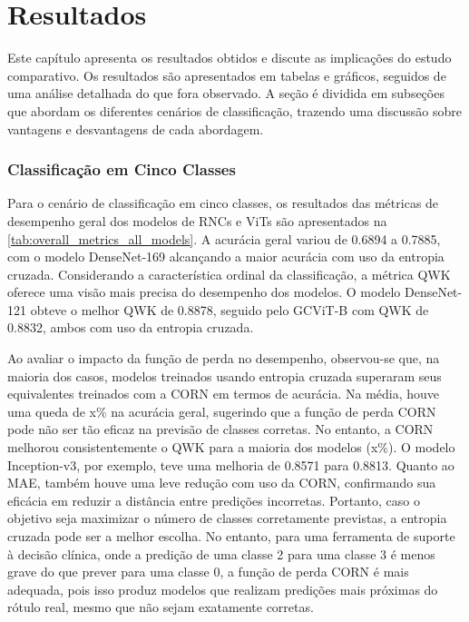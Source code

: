 \chapter{Resultados} \label{cap:resultados}

Este capítulo apresenta os resultados obtidos e discute as implicações do estudo comparativo. Os resultados são apresentados em tabelas e gráficos, seguidos de uma análise detalhada do que fora observado. A seção é dividida em subseções que abordam os diferentes cenários de classificação, trazendo uma discussão sobre vantagens e desvantagens de cada abordagem.

\subsection{Classificação em Cinco Classes}

Para o cenário de classificação em cinco classes, os resultados das métricas de desempenho geral dos modelos de RNCs e ViTs são apresentados na \autoref{tab:overall_metrics_all_models}. A acurácia geral variou de 0.6894 a 0.7885, com o modelo DenseNet-169 alcançando a maior acurácia com uso da entropia cruzada. Considerando a característica ordinal da classificação, a métrica QWK oferece uma visão mais precisa do desempenho dos modelos. O modelo DenseNet-121 obteve o melhor QWK de 0.8878, seguido pelo GCViT-B com QWK de 0.8832, ambos com uso da entropia cruzada.

Ao avaliar o impacto da função de perda no desempenho, observou-se que, na maioria dos casos, modelos treinados usando entropia cruzada superaram seus equivalentes treinados com a CORN em termos de acurácia. Na média, houve uma queda de x\% na acurácia geral, sugerindo que a função de perda CORN pode não ser tão eficaz na previsão de classes corretas. No entanto, a CORN melhorou consistentemente o QWK para a maioria dos modelos (x\%). O modelo Inception-v3, por exemplo, teve uma melhoria de 0.8571 para 0.8813. Quanto ao MAE, também houve uma leve redução com uso da CORN, confirmando sua eficácia em reduzir a distância entre predições incorretas. Portanto, caso o objetivo seja maximizar o número de classes corretamente previstas, a entropia cruzada pode ser a melhor escolha. No entanto, para uma ferramenta de suporte à decisão clínica, onde a predição de uma classe 2 para uma classe 3 é menos grave do que prever para uma classe 0, a função de perda CORN é mais adequada, pois isso produz modelos que realizam predições mais próximas do rótulo real, mesmo que não sejam exatamente corretas.

